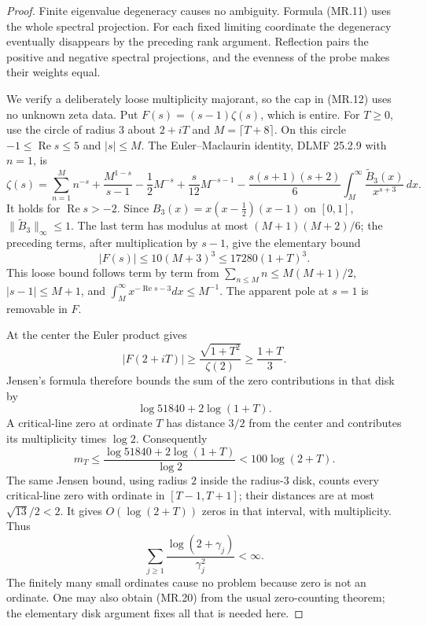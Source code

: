 \begin{proof}
Finite eigenvalue degeneracy causes no ambiguity.  Formula
(MR.11) uses the whole spectral projection.  For each fixed
limiting coordinate the degeneracy eventually disappears by
the preceding rank argument.  Reflection pairs the positive
and negative spectral projections, and the evenness of the
probe makes their weights equal.

We verify a deliberately loose multiplicity majorant, so the
cap in (MR.12) uses no unknown zeta data.  Put
\(F(s)=(s-1)\zeta(s)\), which is entire.  For \(T\ge0\), use
the circle of radius \(3\) about \(2+iT\) and
\(M=\lceil T+8\rceil\).  On this circle
\(-1\le\operatorname{Re}s\le5\) and \(|s|\le M\).
The Euler--Maclaurin identity, DLMF 25.2.9 with \(n=1\), is
\[
 \zeta(s)=\sum_{n=1}^M n^{-s}
       +\frac{M^{1-s}}{s-1}
       -\frac12M^{-s}+\frac{s}{12}M^{-s-1}
       -\frac{s(s+1)(s+2)}6
           \int_M^\infty\frac{\widetilde B_3(x)}{x^{s+3}}\,dx .
 \tag{MR.16}
\]
It holds for \(\operatorname{Re}s>-2\).
Since \(B_3(x)=x(x-\tfrac12)(x-1)\) on \([0,1]\),
\(\|\widetilde B_3\|_\infty\le1\).  The last term has modulus at
most \((M+1)(M+2)/6\); the preceding terms, after multiplication
by \(s-1\), give the elementary bound
\[
  |F(s)|\le10(M+3)^3
       \le17280(1+T)^3.
 \tag{MR.17}
\]
This loose bound follows term by term from
\(\sum_{n\le M}n\le M(M+1)/2\),
\(|s-1|\le M+1\), and
\(\int_M^\infty x^{-\operatorname{Re}s-3}dx
 \le M^{-1}\).
The apparent pole at \(s=1\) is removable in \(F\).

At the center the Euler product gives
\[
 |F(2+iT)|\ge\frac{\sqrt{1+T^2}}{\zeta(2)}
             \ge\frac{1+T}{3}.
\]
Jensen's formula therefore bounds the sum of the zero contributions
in that disk by
\[
              \log51840+2\log(1+T).
 \tag{MR.18}
\]
A critical-line zero at ordinate \(T\) has distance \(3/2\)
from the center and contributes its multiplicity times \(\log2\).
Consequently
\[
 m_T\le\frac{\log51840+2\log(1+T)}{\log2}
                         <100\log(2+T).
 \tag{MR.19}
\]
The same Jensen bound, using radius \(2\) inside the radius-\(3\)
disk, counts every critical-line zero with ordinate in
\([T-1,T+1]\); their distances are at most \(\sqrt{13}/2<2\).
It gives \(O(\log(2+T))\) zeros in that interval, with
multiplicity.  Thus
\[
 \sum_{j\ge1}\frac{\log(2+\gamma_j)}{\gamma_j^2}<\infty.
 \tag{MR.20}
\]
The finitely many small ordinates cause no problem because zero
is not an ordinate.  One may also obtain (MR.20) from the usual
zero-counting theorem; the elementary disk argument fixes all
that is needed here.


\end{proof}
